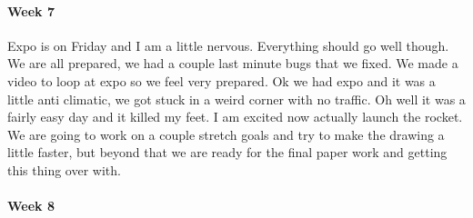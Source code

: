\documentclass[10pt,draftclsnofoot,onecolumn,retainorgcmds]{IEEEtran}
\begin{document}
\paragraph{Week 7}
 Expo is on Friday and I am a little nervous. Everything should go well though. We are all prepared, we had a couple last minute bugs that we fixed. We made a video to loop at expo so we feel very prepared. Ok we had expo and it was a little anti climatic, we got stuck in a weird corner with no traffic. Oh well it was a fairly easy day and it killed my feet. I am excited now actually launch the rocket. We are going to work on a couple stretch goals and try to make the drawing a little faster, but beyond that we are ready for the final paper work and getting this thing over with.\\
\paragraph{Week 8}
\end{document}
